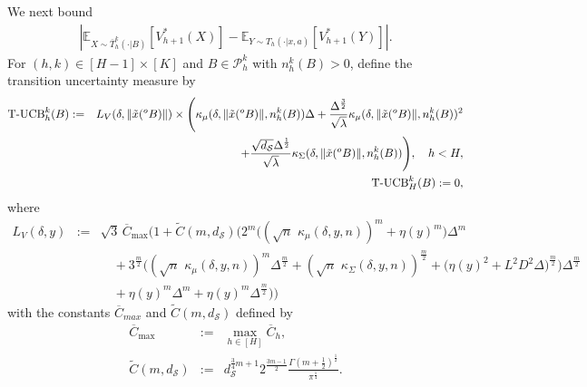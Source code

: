 \documentclass[final,supplement]{siamart251216}
\newcommand{\bCh}{\overline{C}_h} %
\begin{document}
We next bound
\begin{eqnarray*}
    \left|\mathbb{E}_{X \sim \bar{T}_{h}^{k}(\cdot|B)}[V_{h+1}^{*}(X)]- \mathbb{E}_{Y \sim {T}_{h}(\cdot|x,a)}[V_{h+1}^{*}(Y)]\right|.
\end{eqnarray*}
For $(h,k)\in[H-1]\times[K]$ and $B\in\mathcal P_h^k$ with
$n_h^k(B)>0$, define the transition uncertainty measure by
\begin{eqnarray}\label{eq:TUCB}
    \mbox{\rm T-UCB}_{h}^{k}(B)&:=&L_{V}(\delta, \|\tilde{x}(^{o}B)\|)\times \Bigg(\kappa_{\mu}(\delta,\|\tilde{x}(^{o}B)\|,n_h^k(B))\Delta+ \frac{\Delta^{\frac{3}{2}}}{\sqrt{\lambda}}\kappa_{\mu}(\delta,\|\tilde{x}(^{o}B)\|,n_h^k(B))^{2}\nonumber\\   &&+\frac{\sqrt{d_{\mathcal{S}}}\Delta^{\frac{1}{2}}}{\sqrt{\lambda}}\kappa_{\Sigma}(\delta,\|\tilde{x}(^{o}B)\|,n_h^k(B))\Bigg), \quad h<H, \nonumber\\
     &&\hspace{12mm}\mbox{\rm T-UCB}_{H}^{k}(B):=0,
\end{eqnarray}
where
\begin{eqnarray}
   L_{V}(\delta,y)
   &:=&\sqrt{3}\,\overline{C}_{\max}\Bigg(1+{\widetilde{C}(m,d_{\mathcal{S}})}\Bigg( 2^{m}\Big((\sqrt{n}\,\,\kappa_{\mu}(\delta,y,n))^{m}+\eta(y)^m\Big)\Delta^{m} \nonumber\\
        &&\quad+3^{\frac{m}{2}}\Big((\sqrt{n}\,\,\kappa_{\mu}(\delta,y,n))^{m}\Delta^{\frac{m}{2}}+(\sqrt{n}\,\,\kappa_{\Sigma}(\delta,y,n))^{\frac{m}{2}}+\Big(\eta(y)^2+L^2D^2\Delta\Big)^{\frac{m}{2}}\Big)\Delta^{\frac{m}{2}}\nonumber\\
&&\quad+\eta(y)^m\Delta^{m}+\eta(y)^m\Delta^{\frac{m}{2}}\Bigg)\Bigg)\label{eq:Lv definition}
\end{eqnarray}
with the constants $\overline{C}_{max}$ and $\widetilde{C}(m,d_{\mathcal{S}})$ defined by
 \begin{eqnarray}
     \overline{C}_{\max}&:=&\max_{h \in [H]}\bCh,\label{eq:barCmax}\\
    \widetilde{C}(m,d_{\mathcal{S}})&:=&d_{\mathcal{S}}^{\frac{3}{4}m+1}2^{\frac{3m-1}{2}}\frac{\Gamma(m+\frac{1}{2})^{\frac{1}{2}}}{\pi^{\frac{1}{4}}}.\label{eq:C(q,d)}
\end{eqnarray}
\end{document}
